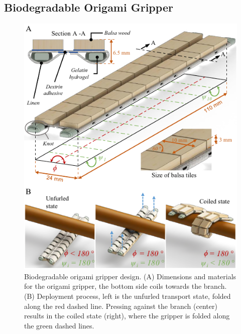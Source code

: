 \subsection{Biodegradable Origami Gripper}
\begin{figure}[!t]
\centering
\includegraphics[width=1\columnwidth]{chapters/papers/BOG/figures/figure3-gripper-design/figure3-gripper-design.pdf}%
\caption{Biodegradable origami gripper design. (A) Dimensions and materials for the origami gripper, the bottom side coils towards the branch. (B) Deployment process, left is the unfurled  transport state, folded along the red dashed line. Pressing against the branch (center) results in the coiled state (right), where the gripper is folded along the green dashed lines.}
\label{fig3_gripper_design}
\end{figure}

